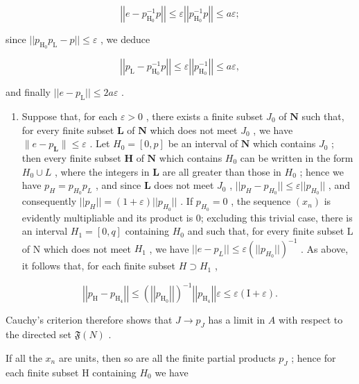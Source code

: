 \[
\left| \left| e - p _ {\mathrm{H} _ {0}} ^ {- 1} p \right| \right| \leqslant \varepsilon \left| \left| p _ {\mathrm{H} _ {0}} ^ {- 1} p \right| \right| \leqslant a \varepsilon ;
\]

since \(||p_{\mathrm{H_0}}p_{\mathrm{L}} - p|| \leqslant \varepsilon\) , we deduce

\[
\left| \left| p _ {\mathrm{L}} - p _ {\mathrm{H} _ {0}} ^ {- 1} p \right| \right| \leqslant \varepsilon \left| \left| p _ {\mathrm{H} _ {0}} ^ {- 1} \right| \right| \leqslant a \varepsilon ,
\]

and finally \(||e - p_{\mathrm{L}}|| \leqslant 2a\varepsilon\) .

\begin{enumerate}
\def\labelenumi{\alph{enumi})}
\setcounter{enumi}{1}
\tightlist
\item
  Suppose that, for each \(\varepsilon > 0\) , there exists a finite subset \(J_0\) of \(\mathbf{N}\) such that, for every finite subset \(\mathbf{L}\) of \(\mathbf{N}\) which does not meet \(J_0\) , we have \(\|e - p_{\mathbf{L}}\| \leqslant \varepsilon\) . Let \(H_0 = [0, p]\) be an interval of \(\mathbf{N}\) which contains \(J_0\) ; then every finite subset \(\mathbf{H}\) of \(\mathbf{N}\) which contains \(H_0\) can be written in the form \(H_0 \cup L\) , where the integers in \(\mathbf{L}\) are all greater than those in \(H_0\) ; hence we have \(p_H = p_{H_0}p_L\) , and since \(\mathbf{L}\) does not meet \(J_0\) , \(||p_H - p_{H_0}|| \leqslant \varepsilon ||p_{H_0}||\) , and consequently \(||p_H|| = (1 + \varepsilon)||p_{H_0}||\) . If \(p_{H_0} = 0\) , the sequence \((x_n)\) is evidently multipliable and its product is 0; excluding this trivial case, there is an interval \(H_1 = [0, q]\) containing \(H_0\) and such that, for every finite subset L of N which does not meet \(H_1\) , we have \(||e - p_L|| \leqslant \varepsilon (||p_{H_0}||)^{-1}\) . As above, it follows that, for each finite subset \(H \supset H_1\) ,
\end{enumerate}

\[
\left| \left| p _ {\mathrm{H}} - p _ {\mathrm{H} _ {4}} \right| \right| \leqslant \left(\left| \left| p _ {\mathrm{H} _ {0}} \right| \right|\right) ^ {- 1} \left| \left| p _ {\mathrm{H} _ {4}} \right| \right| \varepsilon \leqslant \varepsilon (\mathrm{I} + \varepsilon).
\]

Cauchy's criterion therefore shows that \(J \to p_J\) has a limit in \(A\) with respect to the directed set \(\mathfrak{F}(N)\) .

If all the \(x_{n}\) are units, then so are all the finite partial products \(p_{J}\) ; hence for each finite subset H containing \(H_{0}\) we have

